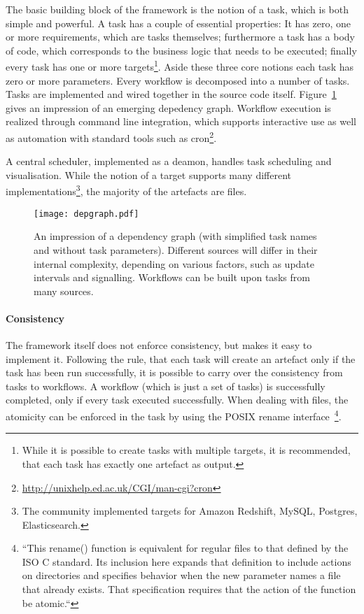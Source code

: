 \documentclass[english]{lni}
\begin{document}
The basic building block of the framework is the notion of a task, which is
both simple and powerful. A task has a couple of essential properties: It
has zero, one or more requirements, which are tasks themselves; furthermore
a task has a body of code, which corresponds to the business logic that needs to
be executed; finally every task has one or more targets\footnote{While it is possible to create tasks with multiple targets, it is recommended, that each task has exactly one artefact as output.}.
Aside these three core notions each task has zero or more parameters.
Every workflow is decomposed into a number of tasks. Tasks are implemented
and wired together in the source code itself. Figure~\ref{impression}
gives an impression of an emerging depedency graph. Workflow execution is realized through command line integration, which supports
interactive use as well as automation with standard tools such as cron\footnote{
\url{http://unixhelp.ed.ac.uk/CGI/man-cgi?cron}}.

A central scheduler, implemented as a deamon, handles task scheduling and visualisation. While the notion of a target supports many different implementations\footnote{The community implemented targets for Amazon Redshift, MySQL, Postgres, Elasticsearch.},
the majority of the artefacts are files.

\begin{figure}[ht!]
\centering
\texttt{[image: depgraph.pdf]}
\caption{An impression of a dependency graph (with simplified task names and without task parameters).
Different sources will differ in their internal complexity,
depending on various factors, such as update intervals and signalling. Workflows can
be built upon tasks from many sources.}
\label{impression}
\end{figure}

\paragraph{Consistency}

The framework itself does not enforce consistency, but makes it easy
to implement it. Following the rule, that each task will create an
artefact only if the task has been run successfully, it is possible
to carry over the consistency from tasks to workflows. A workflow (which is
just a set of tasks) is successfully completed, only if every
task executed successfully. When dealing with files, the atomicity
can be enforced in the task by using the POSIX rename interface~\cite{posix2004}\footnote{``This rename() function is equivalent for regular files to that defined by the ISO C standard. Its inclusion here expands that definition to include actions on directories and specifies behavior when the new parameter names a file that already exists. That specification requires that the action of the function be atomic.``}.
\end{document}
